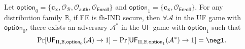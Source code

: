 
\begin{theorem}
\label{thm:ind-uf-lob1}

	Let $\textsf{option}_0 = \{ \mathbf{c_x}, \mathcal{O}_\mathcal{B}, \mathcal{O}_\textsf{auth}, \mathcal{O}_{\textsf{Enroll}} \}$ and $\textsf{option}_1 = \{ \mathbf{c_x}, \mathcal{O}_{\textsf{Enroll}}\}$. For any distribution family $\mathbb{B}$, if \textsf{FE} is fh-IND secure, then $\forall \mathcal{A}$ in the \textsf{UF} game with $\textsf{option}_0$, there exists an adversary $\mathcal{A}^*$ in the $\textsf{UF}$ game with $\textsf{option}_1$ such that
	\[
		\Pr[\textsf{UF}_{\Pi, \mathbb{B}, \textsf{option}_0}(\mathcal{A}) \to 1] - \Pr[\textsf{UF}_{\Pi, \mathbb{B}, \textsf{option}_1}(\mathcal{A}^*) \to 1] = \negl.
	\]

\end{theorem}


